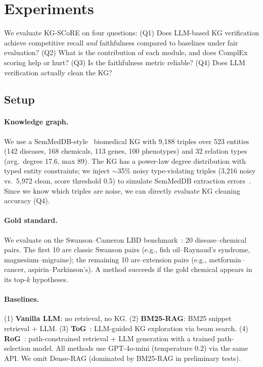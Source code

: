 \section{Experiments}
\label{sec:exp}

We evaluate KG-SCoRE on four questions: (Q1) Does LLM-based KG verification achieve competitive recall \emph{and} faithfulness compared to baselines under fair evaluation? (Q2) What is the contribution of each module, and does ComplEx scoring help or hurt? (Q3) Is the faithfulness metric reliable? (Q4) Does LLM verification actually clean the KG?

\subsection{Setup}
\label{sec:exp:setup}

\paragraph{Knowledge graph.}
We use a SemMedDB-style~\cite{kilicoglu2012semmeddb} biomedical KG with 9{,}188 triples over 523 entities (142 diseases, 168 chemicals, 113 genes, 100 phenotypes) and 32 relation types (avg.\ degree 17.6, max 89). The KG has a power-law degree distribution with typed entity constraints; we inject $\sim$35\% noisy type-violating triples (3{,}216 noisy vs.\ 5{,}972 clean, score threshold 0.5) to simulate SemMedDB extraction errors~\cite{kilicoglu2020broadcoverage}. Since we know which triples are noise, we can directly evaluate KG cleaning accuracy (Q4).

\paragraph{Gold standard.}
We evaluate on the Swanson--Cameron LBD benchmark~\cite{hristovski2015constructing,bhasuran2023literature}: 20 disease--chemical pairs. The first 10 are classic Swanson pairs (e.g., fish oil--Raynaud's syndrome, magnesium--migraine); the remaining 10 are extension pairs (e.g., metformin--cancer, aspirin--Parkinson's). A method succeeds if the gold chemical appears in its top-$k$ hypotheses.

\paragraph{Baselines.}
(1) \textbf{Vanilla LLM}: no retrieval, no KG. (2) \textbf{BM25-RAG}: BM25 snippet retrieval + LLM. (3) \textbf{ToG}~\cite{sun2023thinkongraph}: LLM-guided KG exploration via beam search. (4) \textbf{RoG}~\cite{luo2024graphconstrained}: path-constrained retrieval + LLM generation with a trained path-selection model. All methods use GPT-4o-mini (temperature 0.2) via the same API. We omit Dense-RAG (dominated by BM25-RAG in preliminary tests).

